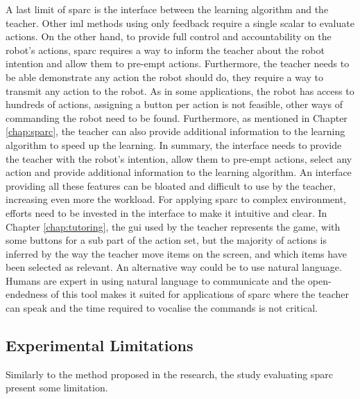 A last limit of \gls{sparc} is the interface between the learning algorithm and the teacher. Other \gls{iml} methods using only feedback require a single scalar to evaluate actions. On the other hand, to provide full control and accountability on the robot's actions, \gls{sparc} requires a way to inform the teacher about the robot intention and allow them to pre-empt actions. Furthermore, the teacher needs to be able demonstrate any action the robot should do, they require a way to transmit any action to the robot. As in some applications, the robot has access to hundreds of actions, assigning a button per action is not feasible, other ways of commanding the robot need to be found. Furthermore, as mentioned in Chapter \ref{chap:sparc}, the teacher can also provide additional information to the learning algorithm to speed up the learning. In summary, the interface needs to provide the teacher with the robot's intention, allow them to pre-empt actions, select any action and provide additional information to the learning algorithm. An interface providing all these features can be bloated and difficult to use by the teacher, increasing even more the workload. For applying \gls{sparc} to complex environment, efforts need to be invested in the interface to make it intuitive and clear. In Chapter \ref{chap:tutoring}, the \gls{gui} used by the teacher represents the game, with some buttons for a sub part of the action set, but the majority of actions is inferred by the way the teacher move items on the screen, and which items have been selected as relevant. An alternative way could be to use natural language. Humans are expert in using natural language to communicate and the open-endedness of this tool makes it suited for applications of \gls{sparc} where the teacher can speak and the time required to vocalise the commands is not critical.

\subsection{Experimental Limitations} \label{sec:disc_experiments} 

Similarly to the method proposed in the research, the study evaluating \gls{sparc} present some limitation. 


